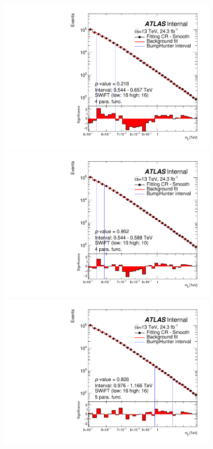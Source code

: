 \begin{figure}[!htb]
\captionsetup[subfigure]{aboveskip=0pt,justification=centering}
\centering
{} {
  \includegraphics[width=0.45\linewidth, angle=0]{figs/Dibjet/LowMass/FitStudy/bhFit_corrFitCR_smooth_4para_low16_high16.pdf}
}
 {
  \includegraphics[width=0.45\linewidth, angle=0]{figs/Dibjet/LowMass/FitStudy/bhFit_corrFitCR_smooth_4para_low10_high10.pdf}
}
 {
  \includegraphics[width=0.45\linewidth, angle=0]{figs/Dibjet/LowMass/FitStudy/bhFit_corrFitCR_smooth_5para_low16_high16.pdf}
}
 {
}
\end{figure}
